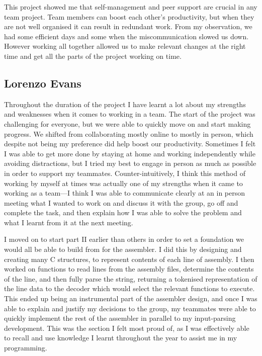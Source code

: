 \documentclass[11pt, oneside, UKenglish]{article}
\begin{document}
This project showed me that self-management and peer support are crucial in any team project.
Team members can boost each other's productivity, but when they are not well organised it can result in redundant work.
From my observation, we had some efficient days and some when the miscommunication slowed us down.
However working all together allowed us to make relevant changes at the right time and get all the parts of the project working on time.

\subsection{Lorenzo Evans}
Throughout the duration of the project I have learnt a lot about my strengths and weaknesses when it comes to working in a team.
The start of the project was challenging for everyone, but we were able to quickly move on and start making progress.
We shifted from collaborating mostly online to mostly in person, which despite not being my preference did help boost our productivity.
Sometimes I felt I was able to get more done by staying at home and working independently while avoiding distractions, but I tried my best to engage in person as much as possible in order to support my teammates.
Counter-intuitively, I think this method of working by myself at times was actually one of my strengths when it came to working as a team---I think I was able to communicate clearly at an in person meeting what I wanted to work on and discuss it with the group, go off and complete the task, and then explain how I was able to solve the problem and what I learnt from it at the next meeting.

I moved on to start part II earlier than others in order to set a foundation we would all be able to build from for the assembler.
I did this by designing and creating many C structures, to represent contents of each line of assembly.
I then worked on functions to read lines from the assembly files, determine the contents of the line, and then fully parse the string, returning a tokenised representation of the line data to the decoder which would select the relevant functions to execute.
This ended up being an instrumental part of the assembler design, and once I was able to explain and justify my decisions to the group, my teammates were able to quickly implement the rest of the assembler in parallel to my input-parsing development.
This was the section I felt most proud of, as I was effectively able to recall and use knowledge I learnt throughout the year to assist me in my programming.
\end{document}
